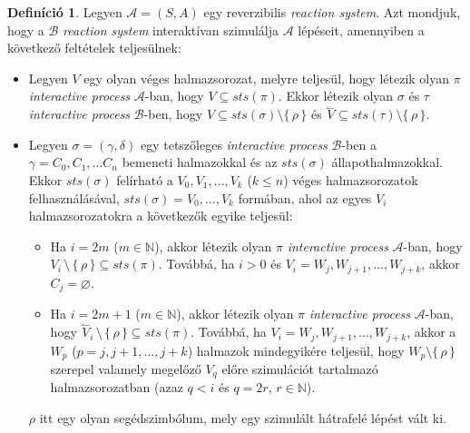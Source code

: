 \documentclass[12pt]{article}
\theoremstyle{definition}
\newtheorem*{definition*}{Definíció}
\theoremstyle{remark}
\theoremstyle{plain}
\theoremstyle{plain}
\let\emptyset\varnothing
\newcommand{\backwardhat}{\overset{\leftharpoonup}}
\begin{document}
    \begin{definition*}
        Legyen $\mathscr{A}=(S, A)$ egy reverzibilis \textit{reaction system}. Azt mondjuk, hogy a $\mathscr{B}$ \textit{reaction system} interaktívan szimulálja $\mathscr{A}$ lépéseit, amennyiben a következő feltételek teljesülnek:
        \begin{itemize}
            \item
            Legyen $V$ egy olyan véges halmazsorozat, melyre teljesül, hogy létezik olyan $\pi$ \textit{interactive process} $\mathscr{A}$-ban, hogy $V \subseteq \textit{sts}(\pi)$. Ekkor létezik olyan $\sigma$ és $\tau$ \textit{interactive process} $\mathscr{B}$-ben, hogy $V \subseteq \textit{sts}(\sigma) \setminus \{ \, \rho \, \}$ és $\backwardhat V \subseteq \textit{sts}(\tau) \setminus \{ \, \rho \, \}$.
            \item
            Legyen $\sigma=(\gamma, \delta)$ egy tetszőleges \textit{interactive process} $\mathscr{B}$-ben a $\gamma = C_{0}, C_{1}, \ldots C_{n}$ bemeneti halmazokkal és az $\textit{sts}(\sigma)$ állapothalmazokkal. Ekkor $\textit{sts}(\sigma)$ felírható a $V_{0}, V_{1}, \ldots, V_{k}$ ($k \leq n$) véges halmazsorozatok felhasználásával, $\textit{sts}(\sigma)=V_{0}, \ldots, V_{k}$ formában, ahol az egyes $V_{i}$ halmazsorozatokra a következők egyike teljesül:
            \begin{itemize}
                \item
                Ha $i = 2m$ ($m \in \mathbb{N}$), akkor létezik olyan $\pi$ \textit{interactive process} $\mathscr{A}$-ban, hogy $V_{i} \,\setminus\, \{ \, \rho \, \}\subseteq \textit{sts}(\pi)$. Továbbá, ha $i > 0$ és $V_{i} = W_{j}, W_{j + 1}, \ldots, W_{j + k}$, akkor $C_{j} = \emptyset$.
                \item
                Ha $i = 2m + 1$ ($m \in \mathbb{N}$), akkor létezik olyan $\pi$ \textit{interactive process} $\mathscr{A}$-ban, hogy $\backwardhat V_{i} \,\setminus\, \{ \, \rho \, \} \subseteq \textit{sts}(\pi)$. Továbbá, ha $V_{i} = W_{j}, W_{j + 1}, \ldots, W_{j + k}$, akkor a $W_{p}$ ($p = j, j + 1, \ldots, j + k$) halmazok mindegyikére teljesül, hogy $W_{p} \setminus \{ \, \rho \, \}$ szerepel valamely megelőző $V_{q}$ előre szimulációt tartalmazó halmazsorozatban (azaz $q < i$ és $q = 2r$, $r \in \mathbb{N}$).
            \end{itemize}
            $\rho$ itt egy olyan segédszimbólum, mely egy szimulált hátrafelé lépést vált ki.
        \end{itemize}
        
    \end{definition*}
\end{document}

